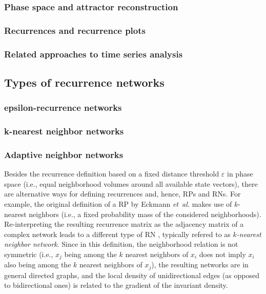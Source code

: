		\subsubsection{Phase space and attractor reconstruction}
		\subsubsection{Recurrences and recurrence plots}
		\subsubsection{Related approaches to time series analysis}

	\subsection{Types of recurrence networks}
		\subsubsection{epsilon-recurrence networks}
		\subsubsection{k-nearest neighbor networks}
		\subsubsection{Adaptive neighbor networks}

Besides the recurrence definition based on a fixed distance threshold $\varepsilon$ in phase space (i.e., equal neighborhood volumes around all available state vectors), there are alternative ways for defining recurrences and, hence, RPs and RNs. For example, the original definition of a RP by Eckmann \textit{et~al.} \cite{Eckmann1987} makes use of $k$-nearest neighbors (i.e., a fixed probability mass of the considered neighborhoods). Re-interpreting the resulting recurrence matrix as the adjacency matrix of a complex network leads to a different type of RN \cite{Shimada2008}, typically refered to as \emph{$k$-nearest neighbor network}. Since in this definition, the neighborhood relation is not symmetric (i.e., $x_j$ being among the $k$ nearest neighbors of $x_i$ does not imply $x_i$ also being among the $k$ nearest neighbors of $x_j$), the resulting networks are in general directed graphs, and the local density of unidirectional edges (as opposed to bidirectional ones) is related to the gradient of the invariant density.

